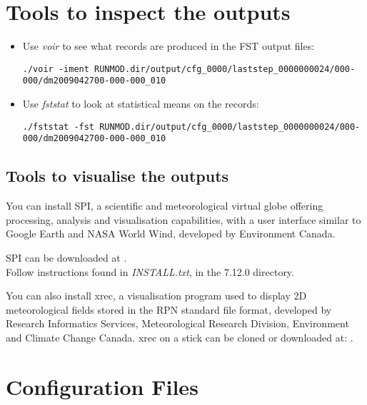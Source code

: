 \documentclass[11pt]{book}
\begin{document}
\section{Tools to inspect the outputs}
\label{tools-outputs}

\begin{itemize} 
\item Use \textit{voir} to see what records are produced in the FST output files:

{\scriptsize\texttt{./voir -iment RUNMOD.dir/output/cfg\_0000/laststep\_0000000024/000-000/dm2009042700-000-000\_010}}

\item Use \textit{fststat} to look at statistical means on the records:

{\scriptsize\texttt{./fststat -fst RUNMOD.dir/output/cfg\_0000/laststep\_0000000024/000-000/dm2009042700-000-000\_010}}

\end{itemize}

\subsection{Tools to visualise the outputs}
\label{tools-SPI}

You can install SPI, a scientific and meteorological virtual globe offering
processing, analysis and visualisation capabilities, with a user interface
similar to Google Earth and NASA World Wind, developed by Environment
Canada.  

SPI can be downloaded at
.\\
Follow instructions found in \textit{INSTALL.txt}, in the 7.12.0 directory.

You can also install xrec, a visualisation program used to display 2D
meteorological fields stored in the RPN standard file format, developed by
Research Informatics Services, Meteorological Research Division, Environment
and Climate Change Canada. xrec on a stick can be cloned or downloaded at:
.

\section{Configuration Files}
\label{config-files}
\end{document}
